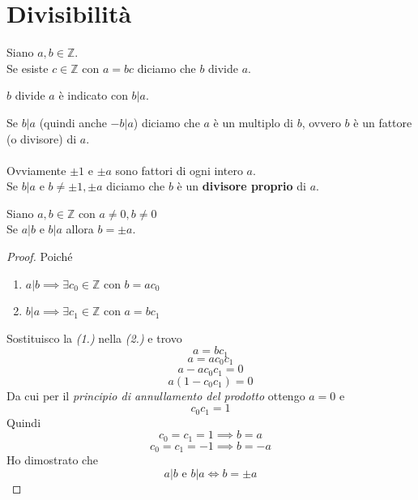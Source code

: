 \documentclass[a4paper,12pt, oneside]{book}
\begin{document}
\section{Divisibilità}
\begin{definizione}
	Siano $a,b \in \mathbb{Z}$.\\
	Se esiste $c \in \mathbb{Z}$ con $a=bc$ diciamo che $b$ divide $a$.
\end{definizione}
\begin{nota}
	$b$ divide $a$ è indicato con $b|a$.
\end{nota}
\begin{osservazione}
	Se $b|a$ (quindi anche $-b|a$) diciamo che $a$ è un multiplo di $b$, ovvero $b$ è un fattore (o divisore) di $a$.\\\\
	Ovviamente $\pm1$ e $\pm a$ sono fattori di ogni intero $a$.\\
	Se $b|a$ e $b \not = \pm 1, \pm a$ diciamo che $b$ è un \textbf{divisore proprio} di $a$.
\end{osservazione}
\begin{osservazione}
	Siano $a,b \in \mathbb{Z}$ con $a \not = 0, b \not = 0$\\
	Se 	$a|b$ e $b|a$ allora $b=\pm a$.
	\begin{proof}
		Poiché\\
		\begin{enumerate}
			\item $a|b \implies \exists c_0 \in \mathbb{Z}$ con $b=a c_0$
			\item $b|a \implies \exists c_1 \in \mathbb{Z}$ con $a=b c_1$
		\end{enumerate}
		Sostituisco la \textit{(1.)} nella \textit{(2.)} e trovo
		$$a = b c_1$$
		$$a = a c_0 c_1$$
		$$a - a c_0 c_1 = 0$$
		$$a(1- c_0 c_1) = 0$$
		Da cui per il \textit{principio di annullamento del prodotto} ottengo $a = 0$ e
		$$c_0 c_1 = 1$$
		Quindi
		$$c_0 = c_1 = 1 \implies b = a$$
		$$c_0 = c_1 = -1 \implies b = -a$$
		Ho dimostrato che
		$$a|b \mbox{ e } b|a \iff b=\pm a$$
	\end{proof}
\end{osservazione}
\end{document}
